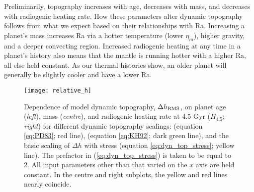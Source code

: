 Preliminarily, topography increases with age, decreases with mass, and decreases with radiogenic heating rate. How these parameters alter dynamic topography follows from what we expect based on their relationships with Ra. Increasing a planet's mass increases Ra via a hotter temperature (lower $\eta_m$), higher gravity, and a deeper convecting region. Increased radiogenic heating at any time in a planet's history also means that the mantle is running hotter with a higher Ra, all else held constant. As our thermal histories show, an older planet will generally be slightly cooler and have a lower Ra.
 




\begin{figure}
  \centering
  \texttt{[image: relative\_h]}
\caption{Dependence of model dynamic topography, $\Delta h_{\rm RMS}$, on planet age (\textit{left}), mass (\textit{centre}), and radiogenic heating rate at 4.5 Gyr ($H_{4.5}$; \textit{right}) for different dynamic topography scalings: \citet{Parsons1983} (equation \ref{eq:PD83}; red line), \citet{Kiefer1992} (equation \ref{eq:KH92}; dark green line), and the basic scaling of $\Delta h$ with stress (equation \ref{eq:dyn_top_stress}; yellow line).  The prefactor in (\ref{eq:dyn_top_stress}) is taken to be equal to 2. All input parameters other than that varied on the $x$ axis are held constant. In the centre and right subplots, the yellow and red lines nearly coincide.}
\label{fig:RMS_v_planet}
\end{figure}


